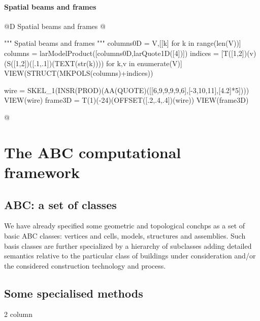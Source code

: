 \documentclass[11pt,oneside]{article}    %
\begin{document}
\paragraph{Spatial beams and frames}
@D Spatial beams and frames
@{""" Spatial beams and frames """
columns0D = V,[[k] for k in range(len(V))]
columns = larModelProduct([columns0D,larQuote1D([4])])
indices = [T([1,2])(v)(S([1,2])([.1,.1])(TEXT(str(k)))) for k,v in enumerate(V)]
VIEW(STRUCT(MKPOLS(columns)+indices))


wire = SKEL_1(INSR(PROD)(AA(QUOTE)([[6,9,9,9,9,6],[-3,10,11],[4.2]*5])))
VIEW(wire)
frame3D = T(1)(-24)(OFFSET([.2,.4,.4])(wire))
VIEW(frame3D)


@}



\section{The ABC computational framework}\label{sec:library}
\subsection{ABC: a set of classes}

We have already specified some geometric and topological conchps as a set of basic ABC classes: vertices and cells, models, structures and assemblies. Such basis classes are further specialized by a hierarchy of subclasses adding detailed semantics relative to the particular class of buildings under consideration and/or the considered construction technology and process.


\subsection{Some specialised methods}
2 column
\end{document}
